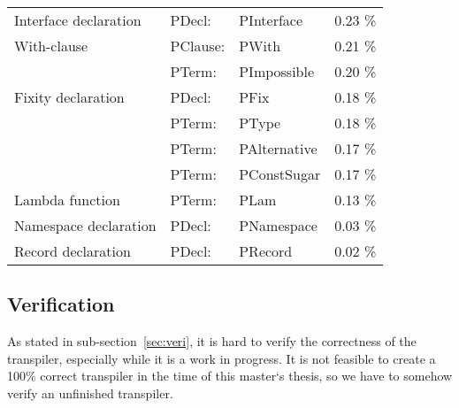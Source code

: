 \documentclass[parskip=half]{scrartcl}
\begin{document}
\begin{table}[h]
\begin{center}
\begin{tabular}{ l l l r }
    Interface declaration    & PDecl:   &    PInterface      &    0.23  \% \\
    With-clause              & PClause: &    PWith           &    0.21  \% \\
                             & PTerm:   &    PImpossible     &    0.20  \% \\
    Fixity declaration       & PDecl:   &    PFix            &    0.18  \% \\
                             & PTerm:   &    PType           &    0.18  \% \\
                             & PTerm:   &    PAlternative    &    0.17  \% \\
                             & PTerm:   &    PConstSugar     &    0.17  \% \\
    Lambda function          & PTerm:   &    PLam            &    0.13  \% \\
    Namespace declaration    & PDecl:   &    PNamespace      &    0.03  \% \\
    Record declaration       & PDecl:   &    PRecord         &    0.02  \% \\

  \end{tabular}
\end{center}
\end{table}




\subsection{Verification}


As stated in sub-section~\ref{sec:veri}, it is hard to verify the correctness
of the transpiler, especially while it is a work in progress. It is not
feasible to create a 100\% correct transpiler in the time of this master`s
thesis, so we have to somehow verify an unfinished transpiler.
\end{document}
